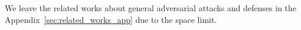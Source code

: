 We leave the related works about general adversarial attacks and defenses in the Appendix~\ref{sec:related_works_app} due to the space limit.
















